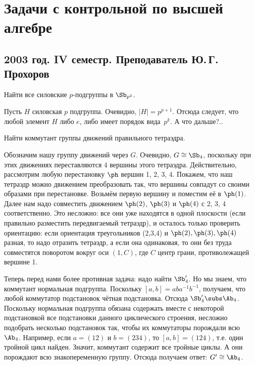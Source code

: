 \documentclass[a4paper]{article}
\begin{document}
\section*{Задачи с контрольной по высшей алгебре}
\subsection*{2003 год. IV семестр. Преподаватель Ю.\,Г.\,Прохоров}

\begin{problem}
Найти все силовские $p$-подгруппы в $\Sb_{p^2}$.
\end{problem}
\begin{solution}
Пусть $H$ силовская $p$ подгруппа. Очевидно, $|H|=p^{p+1}$. Отсюда следует, что любой
элемент $H$ либо $e$, либо имеет порядок вида~$p^k$.
А что дальше?..
\end{solution}

\begin{problem}
Найти коммутант группы движений правильного тетраэдра.
\end{problem}
\begin{solution}
Обозначим нашу группу движений через $G$. Очевидно, $G \cong \Sb_4$, поскольку при этих движениях
переставляются 4 вершины этого тетраэдра. Действительно, рассмотрим любую перестановку $\ph$ вершин 1, 2, 3, 4.
Покажем, что наш тетраэдр можно движением преобразовать так, что вершины совпадут со своими образами при
перестановке. Возьмём  первую вершину и поместим её в $\ph(1)$. Далее нам надо совместить движением $\ph(2)$,
$\ph(3)$ и $\ph(4)$ с 2, 3, 4 соответственно. Это несложно: все они уже находятся в одной плоскости (если
правильно разместить передвигаемый тетраэдр), и осталось только проверить ориентацию: если ориентация
треугольников (2,3,4) и $\ph(2),\ph(3),\ph(4)$ разная, то надо отразить тетраэдр, а если она одинаковая, то
они без труда совместятся поворотом вокруг оси $(1,C)$, где $C$ центр грани, противолежащей вершине 1.

Теперь перед нами более противная задача: надо найти $\Sb_4'$. Но мы знаем, что коммутант нормальная
подгруппа. Поскольку $[a,b]=aba^{-1}b^{-1}$, получаем, что любой коммутатор подстановок чётная
подстановка. Отсюда $\Sb_4' \subs \Ab_4$. Поскольку нормальная подгруппа обязана содержать вместе с
некоторой подстановкой все подстановки данного циклического строения, несложно подобрать несколько
подстановок так, чтобы их коммутаторы порождали всю $\Ab_4$. Например, если $a=(12)$ и $b=(234)$, то
$[a,b]=(124)$, т.е. один тройной цикл найден. Значит, коммутант содержит все тройные циклы. А они порождают
всю знакопеременную группу. Отсюда получаем ответ: $G' \cong \Ab_4$.
\end{solution}
\end{document}

